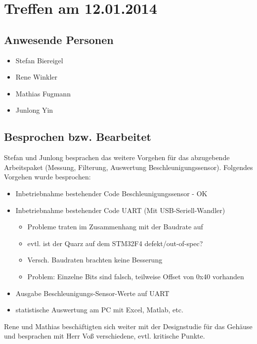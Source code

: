 \chapter{Treffen am 12.01.2014}
\section{Anwesende Personen}
\begin{itemize}
	\item Stefan Biereigel
	\item Rene Winkler
	\item Mathias Fugmann
	\item Junlong Yin
\end{itemize}

\section{Besprochen bzw. Bearbeitet}
Stefan und Junlong besprachen das weitere Vorgehen für das abzugebende Arbeitspaket (Messung, Filterung, Auswertung Beschleunigungssensor). Folgendes Vorgehen wurde besprochen:
\begin{itemize}
	\item Inbetriebnahme bestehender Code Beschleunigungssensor - OK
	\item Inbetriebnahme bestehender Code UART (Mit USB-Seriell-Wandler)
	\begin{itemize}
		\item Probleme traten im Zusammenhang mit der Baudrate auf
		\item evtl. ist der Quarz auf dem STM32F4 defekt/out-of-spec?
		\item Versch. Baudraten brachten keine Besserung
		\item Problem: Einzelne Bits sind falsch, teilweise Offset von 0x40 vorhanden
	\end{itemize}
	\item Ausgabe Beschleunigungs-Sensor-Werte auf UART
	\item statistische Auswertung am PC mit Excel, Matlab, etc.
\end{itemize}

Rene und Mathias beschäftigten sich weiter mit der Designstudie für das Gehäuse und besprachen mit Herr Voß verschiedene, evtl. kritische Punkte.